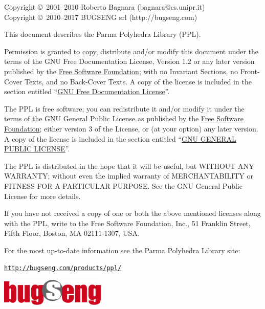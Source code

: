 \documentclass[a4paper,twoside]{article}
\newcommand{\+}{\discretionary{\mbox{\scriptsize$\hookleftarrow$}}{}{}}
\begin{document}
\newpage
Copyright \copyright\ 2001--2010 Roberto Bagnara (bagnara@cs.unipr.it) \\
Copyright \copyright\ 2010--2017 BUGSENG srl (http://bugseng.com)


This document describes the Parma Polyhedra Library (PPL).

Permission is granted to copy, distribute and/or modify this document
under the terms of the GNU Free Documentation License, Version 1.2
or any later version published by the
\href{http://www.fsf.org}{Free Software Foundation};
with no Invariant Sections, no Front-Cover Texts, and no Back-Cover Texts.
A copy of the license is included in the section entitled
``\hyperlink{GFDL_GFDL}{GNU Free Documentation License}''.

The PPL is free software; you can redistribute it and/or modify it
under the terms of the GNU General Public License as published by the
\href{http://www.fsf.org}{Free Software Foundation}; either version 3
of the License, or (at your option) any later version.
A copy of the license is included in the section entitled
``\hyperlink{GPL_GPL}{GNU GENERAL PUBLIC LICENSE}''.

The PPL is distributed in the hope that it will be useful, but WITHOUT
ANY WARRANTY; without even the implied warranty of MERCHANTABILITY or
FITNESS FOR A PARTICULAR PURPOSE.  See the GNU General Public License
for more details.

If you have not received a copy of one or both the above mentioned
licenses along with the PPL, write to the Free Software Foundation,
Inc., 51 Franklin Street, Fifth Floor, Boston, MA 02111-1307, USA.

For the most up-to-date information see the Parma Polyhedra Library
site:
\begin{center}
\href{http://bugseng.com/products/ppl/}{\tt http://bugseng.com/products/ppl/}
\end{center}
\vfill
\begin{center}
\includegraphics[width=5cm]{bugseng_logo.pdf}
\end{center}
\vfill
\clearpage{\pagestyle{empty}\cleardoublepage}


\addtolength{\cftsubsecnumwidth}{1em}

\tableofcontents
\clearpage{\pagestyle{empty}\cleardoublepage}

\end{document}
